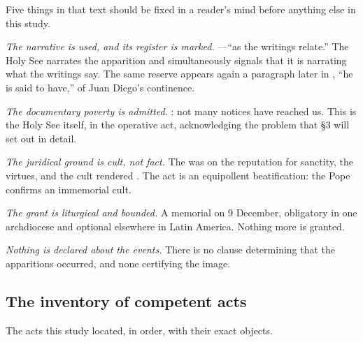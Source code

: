 Five things in that text should be fixed in a reader's mind before
anything else in this study.

\emph{The narrative is used, and its register is marked.}
---``as the writings relate.'' The Holy See
narrates the apparition and simultaneously signals that it is
narrating what the writings say. The same reserve appears again a
paragraph later in , ``he is said to have,'' of Juan
Diego's continence.

\emph{The documentary poverty is admitted.} : not many notices have reached us. This is the Holy See
itself, in the operative act, acknowledging the problem that \S3 will
set out in detail.

\emph{The juridical ground is cult, not fact.} The  was
on the reputation for sanctity, the virtues, and the cult rendered
. The act is an equipollent beatification: the
Pope confirms an immemorial cult.

\emph{The grant is liturgical and bounded.} A memorial on 9 December,
obligatory in one archdiocese and optional elsewhere in Latin
America. Nothing more is granted.

\emph{Nothing is declared about the events.} There is no clause
determining that the apparitions occurred, and none certifying the
image.

\subsection{The inventory of competent acts}

The acts this study located, in order, with their exact objects.

